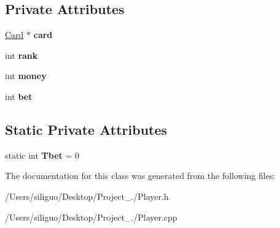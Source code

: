 \subsection*{Private Attributes}
\begin{DoxyCompactItemize}
\item 
\hypertarget{class_player_a63492e432ef43e5f1e972fd75d1a28ee}{}\label{class_player_a63492e432ef43e5f1e972fd75d1a28ee} 
\hyperlink{class_card}{Card} $\ast$ {\bfseries card}
\item 
\hypertarget{class_player_a307c222c67b1318ec1d7dc9095c50a98}{}\label{class_player_a307c222c67b1318ec1d7dc9095c50a98} 
int {\bfseries rank}
\item 
\hypertarget{class_player_a9545beef70350d5c3b3a5719a890dd2f}{}\label{class_player_a9545beef70350d5c3b3a5719a890dd2f} 
int {\bfseries money}
\item 
\hypertarget{class_player_a9ad8e498594182ced9e8091de332f6d0}{}\label{class_player_a9ad8e498594182ced9e8091de332f6d0} 
int {\bfseries bet}
\end{DoxyCompactItemize}
\subsection*{Static Private Attributes}
\begin{DoxyCompactItemize}
\item 
\hypertarget{class_player_a0d3d76e3e84fffd06d0cd5af4def0260}{}\label{class_player_a0d3d76e3e84fffd06d0cd5af4def0260} 
static int {\bfseries Tbet} = 0
\end{DoxyCompactItemize}


The documentation for this class was generated from the following files\+:\begin{DoxyCompactItemize}
\item 
/\+Users/siliguo/\+Desktop/\+Project\+\_./Player.\+h\item 
/\+Users/siliguo/\+Desktop/\+Project\+\_./Player.\+cpp\end{DoxyCompactItemize}
